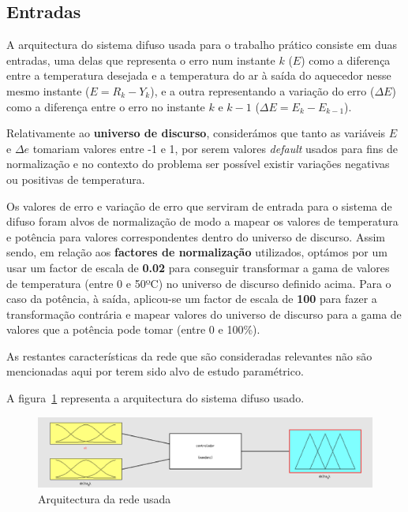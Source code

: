 \documentclass{article}
\begin{document}
\subsection{Entradas}
\indent \indent A arquitectura do sistema difuso usada para o trabalho prático consiste em duas entradas, uma delas que representa o erro num instante $k$ ($E$) como a diferença entre a temperatura desejada e a temperatura do ar à saída do aquecedor nesse mesmo instante ($E = R_{k} - Y_{k}$), e a outra representando a variação do erro ($\Delta E$) como a diferença entre o erro no instante $k$ e $k-1$ ($\Delta E=E_{k}-E_{k-1}$).

Relativamente ao \textbf{universo de discurso}, considerámos que tanto as variáveis $E$ e $\Delta e$ tomariam valores entre -1 e 1, por serem valores \textit{default} usados para fins de normalização e no contexto do problema ser possível existir variações negativas ou positivas de temperatura.

Os valores de erro e variação de erro que serviram de entrada para o sistema de difuso foram alvos de normalização de modo a mapear os valores de temperatura e potência para valores correspondentes dentro do universo de discurso. Assim sendo, em relação aos \textbf{factores de normalização} utilizados, optámos por um usar um factor de escala de \textbf{0.02} para conseguir transformar a gama de valores de temperatura (entre 0 e 50ºC) no universo de discurso definido acima. Para o caso da potência, à saída, aplicou-se um factor de escala de \textbf{100} para fazer a transformação contrária e mapear valores do universo de discurso para a gama de valores que a potência pode tomar (entre 0 e 100\%). 



As restantes características da rede que são consideradas relevantes não são mencionadas aqui por terem sido alvo de estudo paramétrico.

A figura~\ref{nn_architecture} representa a arquitectura do sistema difuso usado.

\begin{figure}[!h]
  \centering
  \includegraphics[width=5in]{figures/nn_architecture}
  \caption{Arquitectura da rede usada}
  \label{nn_architecture}
\end{figure}
\end{document}
